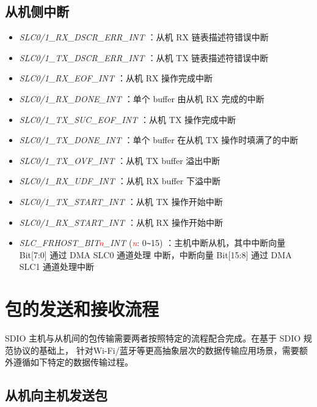 \documentclass[main\_\_CN.tex]{subfiles}
\begin{document}
\subsection{从机侧中断}
\begin{itemize}
\item {\it SLC0/1\_RX\_DSCR\_ERR\_INT \label{int:SLC01RXDSCRERRINT}}：从机 RX 链表描述符错误中断
\item {\it SLC0/1\_TX\_DSCR\_ERR\_INT \label{int:SLC01TXDSCRERRINT}}：从机 TX 链表描述符错误中断
\item {\it SLC0/1\_RX\_EOF\_INT \label{int:SLC01RXEOFINT}}：从机 RX 操作完成中断
\item {\it SLC0/1\_RX\_DONE\_INT \label{int:SLC01RXDONEINT}}：单个 buffer 由从机 RX 完成的中断
\item {\it SLC0/1\_TX\_SUC\_EOF\_INT \label{int:SLC01TXSUCEOFINT}}：从机 TX 操作完成中断
\item {\it SLC0/1\_TX\_DONE\_INT \label{int:SLC01TXDONEINT}}：单个 buffer 在从机 TX 操作时填满了的中断
\item {\it SLC0/1\_TX\_OVF\_INT \label{int:SLC01TXOVFINT}}：从机 TX buffer 溢出中断
\item {\it SLC0/1\_RX\_UDF\_INT \label{int:SLC01RXUDFINT}}：从机 RX buffer 下溢中断
\item {\it SLC0/1\_TX\_START\_INT \label{int:SLC01TXSTARTINT}}：从机 TX 操作开始中断
\item {\it SLC0/1\_RX\_START\_INT \label{int:SLC01RXSTARTINT}}：从机 RX 操作开始中断
\item {\it SLC\_FRHOST\_BIT\textcolor{red}{\it{n}}\_INT \label{int:SLCFRHOSTBITnINT}} (\textcolor{red}{\it{n}}: 0\verb+~+15) ：主机中断从机，其中中断向量 Bit[7:0] 通过 DMA SLC0 通道处理 中断，中断向量 Bit[15:8] 通过 DMA SLC1 通道处理中断
\end{itemize}

\section{包的发送和接收流程}

SDIO 主机与从机间的包传输需要两者按照特定的流程配合完成。在基于 SDIO 规范协议的基础上， \chipname{} 针对Wi-Fi/蓝牙等更高抽象层次的数据传输应用场景，需要额外遵循如下特定的数据传输过程。

\subsection{从机向主机发送包}
\end{document}
